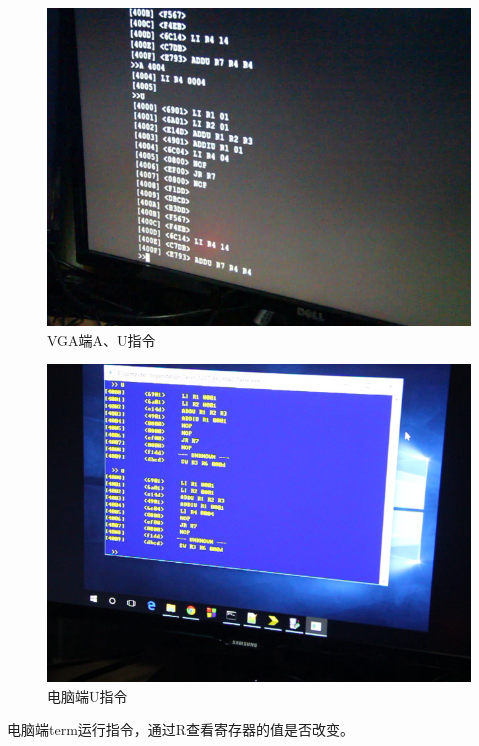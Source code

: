 \begin{figure}[H]
  \includegraphics[width=\linewidth]{Figures/picture/vlcsnap-2015-12-10-00h18m33s048.png}
  \caption{VGA端A、U指令}
\end{figure}

\begin{figure}[H]
  \includegraphics[width=\linewidth]{Figures/picture/vlcsnap-2015-12-10-00h18m41s120.png}
  \caption{电脑端U指令}
\end{figure}

电脑端term运行指令，通过R查看寄存器的值是否改变。

